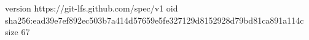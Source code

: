 version https://git-lfs.github.com/spec/v1
oid sha256:ead39e7ef892ec503b7a414d57659e5fe327129d8152928d79bd81ca891a114c
size 67
